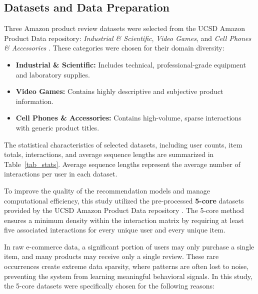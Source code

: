 \documentclass[conference]{IEEEtran}
\begin{document}
\subsection{Datasets and Data Preparation}

Three Amazon product review datasets were selected from the UCSD Amazon Product Data repository: \textit{Industrial \& Scientific}, \textit{Video Games}, and \textit{Cell Phones \& Accessories} \cite{b21}. These categories were chosen for their domain diversity: 
\begin{itemize}
    \item \textbf{Industrial \& Scientific:} Includes technical, professional-grade equipment and laboratory supplies.
    \item \textbf{Video Games:} Contains highly descriptive and subjective product information.
    \item \textbf{Cell Phones \& Accessories:} Contains high-volume, sparse interactions with generic product titles.
\end{itemize}

The statistical characteristics of selected datasets, including user counts, item totals, interactions, and average sequence lengths are summarized in Table~\ref{tab_stats}. Average sequence lengths represent the average number of interactions per user in each dataset.


To improve the quality of the recommendation models and manage computational efficiency, this study utilized the pre-processed \textbf{5-core} datasets provided by the UCSD Amazon Product Data repository \cite{b21}. The 5-core method ensures a minimum density within the interaction matrix by requiring at least five associated interactions for every unique user and every unique item. 

In raw e-commerce data, a significant portion of users may only purchase a single item, and many products may receive only a single review. These rare occurrences create extreme data sparsity, where patterns are often lost to noise, preventing the system from learning meaningful behavioral signals. In this study, the 5-core datasets were specifically chosen for the following reasons:
\end{document}
